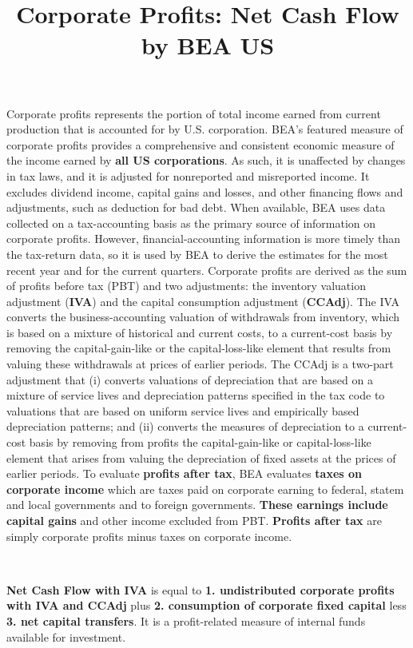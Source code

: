 \documentclass{article}
\title{Corporate Profits: Net Cash Flow by BEA US}
\begin{document}
	\large{

\maketitle

Corporate profits represents the portion of total income earned from current production that is accounted for by U.S. corporation. BEA's featured measure of corporate profits provides a comprehensive and consistent economic measure of the income earned by \textbf{all US corporations}. As such, it is unaffected by changes in tax laws, and it is adjusted for nonreported and misreported income. It excludes dividend income, capital gains and losses, and other financing flows and adjustments, such as deduction for bad debt. When available, BEA uses data collected on a tax-accounting basis as the primary source of information on corporate profits. However, financial-accounting information is more timely than the tax-return data, so it is used by BEA to derive the estimates for the most recent year and for the current quarters. Corporate profits are derived as the sum of profits before tax (PBT) and two adjustments: the inventory valuation adjustment (\textbf{IVA}) and the capital consumption adjustment (\textbf{CCAdj}). The IVA converts the business-accounting valuation of withdrawals from inventory, which is based on a mixture of historical and current costs, to a current-cost basis by removing the capital-gain-like or the capital-loss-like element that results from valuing these withdrawals at prices of earlier periods. The CCAdj is a two-part adjustment that (i) converts valuations of depreciation that are based on a mixture of service lives and depreciation patterns specified in the tax code to valuations that are based on uniform service lives and empirically based depreciation patterns; and (ii) converts the measures of depreciation to a current-cost basis by removing from profits the capital-gain-like or capital-loss-like element that arises from valuing the depreciation of fixed assets at the prices of earlier periods. To evaluate \textbf{profits after tax}, BEA evaluates \textbf{taxes on corporate income}
which are taxes paid on corporate earning to federal, statem and local governments and to foreign governments. \textbf{These earnings include capital gains} and other income excluded from PBT. \textbf{Profits after tax} are simply corporate profits minus taxes on corporate income.

\

\textbf{Net Cash Flow with IVA} is equal to \textbf{1. undistributed corporate profits with IVA and CCAdj} plus \textbf{2. consumption of corporate fixed capital} less \textbf{3. net capital transfers}. It is a profit-related measure of internal funds available for investment. 

}
\end{document}
